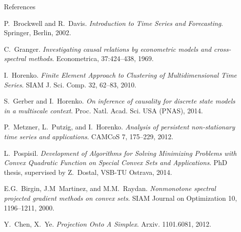 \documentclass[final,hyperref={pdfpagelabels=false}]{beamer}
\begin{document}
\begin{frame}[t]
\begin{columns}[t]
\begin{column}{.48\textwidth}
\begin{block}{References}
        
\nocite{*} %
\small{



%

\begin{thebibliography}{}

P.~Brockwell and R.~Davis.
{\em Introduction to Time Series and Forecasting}.
Springer, Berlin, 2002.

C.~Granger.
{\em Investigating causal relations by econometric models and cross-spectral methods}.
Econometrica, 37:424--438, 1969.

I.~Horenko.
{\em Finite Element Approach to Clustering of Multidimensional Time Series}.
SIAM J. Sci. Comp. 32, 62--83, 2010.

S.~Gerber and I.~Horenko.
{\em On inference of causality for discrete state models in a multiscale context}.
Proc. Natl. Acad. Sci. USA (PNAS), 2014.

P.~Metzner, L.~Putzig, and I.~Horenko.
{\em Analysis of persistent non-stationary time series and applications}.
 CAMCoS 7, 175--229, 2012.

L.~Pospisil.
{\em Development of Algorithms for Solving Minimizing Problems
with Convex Quadratic Function on Special Convex Sets and Applications}.
PhD thesis, supervised by Z.~Dostal, VSB-TU Ostrava, 2014.

E.G.~Birgin, J.M~Martinez, and M.M.~Raydan.
{\em Nonmonotone spectral projected gradient methods on convex sets}. 
SIAM Journal on Optimization 10, 1196--1211, 2000.

Y.~Chen, X.~Ye.
{\em Projection Onto A Simplex}.
Arxiv. 1101.6081, 2012.


\end{thebibliography}

}

\end{block}





\end{column} %

\begin{column}{.008\textwidth}\end{column} %

\end{columns} %

\end{frame} %
\end{document}
